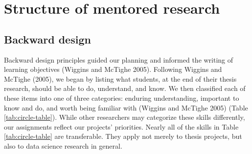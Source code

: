 \documentclass[
]{article}
\begin{document}
\hypertarget{structure-of-mentored-research}{%
\section{Structure of mentored research}\label{structure-of-mentored-research}}

\hypertarget{backward-design}{%
\subsection{Backward design}\label{backward-design}}

Backward design principles guided our planning and informed the writing of
learning objectives (Wiggins and McTighe 2005). Following Wiggins and McTighe (2005),
we began by listing
what students, at the end of their thesis research, should be able to do,
understand, and know. We then classified each of these items into
one of three categories: enduring understanding, important to know and do,
and worth being familiar with (Wiggins and McTighe 2005) (Table \ref{tab:circle-table}).
While other researchers may categorize these skills differently,
our assignments reflect our projects' priorities.
Nearly all of the skills in Table \ref{tab:circle-table} are
transferable. They apply not merely to thesis projects, but also to
data science research in general.
\end{document}
